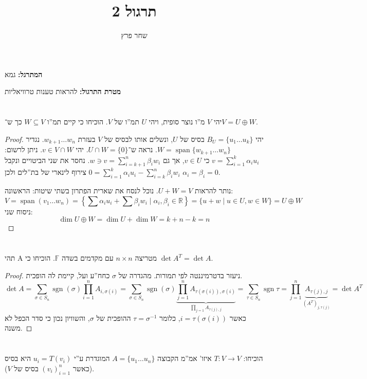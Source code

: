 \documentclass[]{article}
\author{שחר פרץ}
\title{תרגול 2}
\newcommand\R     {\mathbb{R}}
\DeclareMathOperator{\Sp}     {span}
\DeclareMathOperator{\sgn}    {sgn}
\newcommand\F         {\mathbb{F}}
\newcommand\co        {\colon}
\newcommand\ag        {\alpha}
\newcommand\bg        {\beta}
\newcommand\sg        {\sigma}
\newcommand\op    {^{-1}}
\newcommand\ccb[1]    {\left \{ #1 \right \}}
\theoremstyle{definition}
\begin{document}
	\maketitle
	\textbf{המתרגל: }גמא
	
	\textbf{מטרת התרגול: }להראות טענות טרוויאליות
	
	\section{}
	יהי $V$ מ''ו נוצר סופית, ויהי $U$ תמ''ו של $V$. הוכיחו כי קיים תמ''ו $W \subseteq V$ כך ש־$V = U \oplus W$. 
	
	\begin{proof}
		יהי $B_U = \{u_1 \dots u_k\}$ בסיס של $U$, ונשלים אותו לבסיס של $V$ בעזרת $w_{k + 1} \dots w_n$. נגדיר $W = \Sp\{w_{k + 1} \dots w_n\}$. נראה ש־$U \cap W = \{0\}$. יהי $v \in V \cap W$. ניתן לרשום: $v = \sum_{i = 1}^k \ag_i u_i$ כי $v \in U$, אך גם $w \ni v = \sum_{i = k + 1}^{n} \bg_i w_i$. נחסר את שני הביטויים ונקבל $0 = \sum_{i = 1}^{k} \ag_i u_i - \sum_{i = k}^{n} \bg_i w_i$ צירוף לינארי של בת''לים ולכן $\ag_i = \bg_i = 0$. 
		
		נותר להראות $U + W = V$. נוכל לנסח את שארית הפתרון בשתי שיטות: הראשונה: 
		\[ V = \Sp(v_1 \dots w_n) = \ccb{\sum \ag_i u_i + \sum \bg_i w_i \mid \ag_i, \bg_i \in \R} = \{u + w \mid u \in U, w \in W\} = U \oplus W \]
		ניסוח שני: 
		\[ \dim U \oplus W = \dim U + \dim W = k + n - k = n \]
	\end{proof}
	
	\section{}
	תהי A מטריצה $n \times n$ עם מקדמים בשדה $\F$. הוכיחו כי $\det A^T = \det A$. 
	\begin{proof}
		ניעזר בדטרמיננטה לפי תמורות. מהגדרה של $\sg$ כחח''ע ועל, קיימת לה הופכית. 
		\[ \det A = \sum_{\sg \in S_n}\sgn (\sg) \prod_{i =1}^{n}A_{i, \sg(i)} = \sum_{\sg \in S_n}\sgn (\sg) \underbrace{\prod_{j =1}^{n}A_{\tau(\sg(i)), \sg(i)}}_{\prod_{j = 1}A_{\tau(j), j}} = \sum_{\tau \in S_n} \sgn \tau = \prod_{j = 1}^{n}\underbrace{A_{\tau(j), j}}_{(A^T)_{j, \tau(j)}} = \det A^T \]
		כאשר $i = \tau(\sg(i))$, כלומר $\tau = \sg\op$ ההופכית של $\sg$, והשוויון נכון כי סדר הכפל לא משנה. 		
	\end{proof}
	
	\section{}
	הוכיחו: $T \co V \to V$ איזו' אמ''מ הקבוצה $A = \{u_1 \dots u_n\}$ המוגדרת ע''י $u_i = T(v_i)$ היא בסיס (כאשר $(v_i)_{i = 1}^{n}$ בסיס של $V$). 
	
\end{document}
